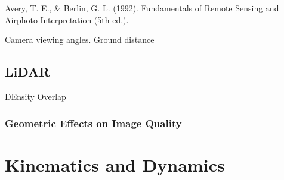 \cite{Avery1992}
Avery, T. E., \& Berlin, G. L. (1992). Fundamentals of Remote Sensing and Airphoto Interpretation (5th ed.).

Camera viewing angles.
Ground distance





\subsection{LiDAR}

DEnsity
Overlap


\subsubsection{Geometric Effects on Image Quality}


\section{Kinematics and Dynamics}







